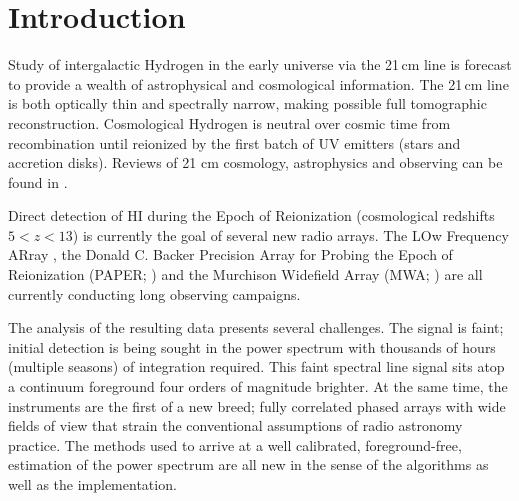 \documentclass[preprint]{aastex}
\begin{document}





\section{Introduction} 
  Study of intergalactic Hydrogen  in the early universe via the 21\,cm line is forecast to provide a wealth of astrophysical and cosmological information.  The 21\,cm line is both optically thin and spectrally narrow, making possible full tomographic reconstruction. Cosmological Hydrogen is neutral over cosmic time from recombination until reionized by the first batch of UV emitters (stars and accretion disks).  Reviews of 21 cm cosmology, astrophysics and observing can be found in \cite{Morales:2010p8093,Furlanetto:2006p2267,Pritchard:2012p9555,zaroubi2013epoch}.
  
Direct detection of HI during the Epoch of Reionization (cosmological redshifts $5<z<13$) is currently the goal of several new radio arrays. The LOw Frequency ARray \citep[LOFAR;]{Yatawatta:2013p9699}, the Donald C. Backer Precision Array for Probing the Epoch of Reionization (PAPER; \citet{Parsons:2014p10499}) and the Murchison Widefield Array (MWA; ) are all currently conducting long observing campaigns.

The analysis of the resulting data presents several challenges. The signal is faint; initial detection is being sought in the power spectrum with thousands of hours (multiple seasons) of integration required. This faint spectral line signal sits atop a continuum foreground four orders of magnitude brighter. At the same time, the instruments are the first of a new breed; fully correlated phased arrays with wide fields of view that strain the conventional assumptions of radio astronomy practice. The methods used to arrive at a well calibrated, foreground-free, estimation of the power spectrum are all new in the sense of the algorithms as well as the implementation.  
\end{document}
